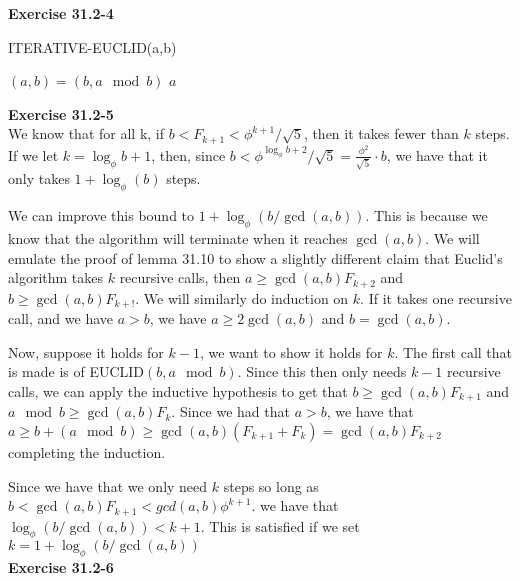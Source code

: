 \documentclass{article}
\begin{document}
\noindent\textbf{Exercise 31.2-4}\\

\begin{algorithm}
\caption{ITERATIVE-EUCLID(a,b)}
\begin{algorithmic}[1]
	\State $(a,b) = (b, a \mod b)$
\EndWhile
\State \Return $a$
\end{algorithmic}
\end{algorithm}

\noindent\textbf{Exercise 31.2-5}\\

We know that for all k, if $b < F_{k+1} < \phi^{k+1}/\sqrt{5}$, then it takes fewer than $k$ steps. If we let $k = \log_\phi{b} + 1$, then, since $b < \phi^{\log_\phi{b} + 2}/\sqrt{5} = \frac{\phi^2}{\sqrt{5}} \cdot b$, we have that it only takes $1+\log_\phi(b)$ steps.

We can improve this bound to $1 + \log_{\phi}(b/\gcd(a,b))$. This is because we know that the algorithm will terminate when it reaches $\gcd(a,b)$. We will emulate the proof of lemma 31.10 to show a slightly different claim that Euclid's algorithm takes $k$ recursive calls, then $a \ge \gcd(a,b) F_{k+2}$ and $b \ge \gcd(a,b) F_{k+!}$. We will similarly do induction on $k$. If it takes one recursive call, and we have $a>b$, we have $a \ge 2\gcd(a,b)$ and $b=\gcd(a,b)$.

Now, suppose it holds for $k-1$, we want to show it holds for $k$. The first call that is made is of EUCLID$(b,a\mod b)$. Since this then only needs $k-1$ recursive calls, we can apply the inductive hypothesis to get that $b \ge \gcd(a,b) F_{k+1}$ and $a\mod b \ge \gcd(a,b) F_{k}$. Since we had that $a > b$, we have that $a \ge b + (a\mod b) \ge \gcd(a,b) ( F_{k+1} + F_{k}) = \gcd(a,b) F_{k+2}$ completing the induction.

Since we have that we only need $k$ steps so long as $b <\gcd(a,b) F_{k+1} < gcd(a,b) \phi^{k+1}$. we have that $\log_\phi (b/\gcd(a,b)) < k+1$. This is satisfied if we set $k=1 + \log_\phi(b/\gcd(a,b))$\\

\noindent\textbf{Exercise 31.2-6}\\
\end{document}
